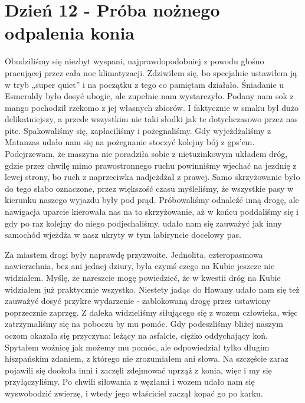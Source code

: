 
\chapter[Próba nożnego odpalenia konia]{Dzień 12 - Próba nożnego odpalenia konia}

Obudziliśmy się niezbyt wyspani, najprawdopodobniej z powodu głośno pracującej przez cała noc klimatyzacji.
Zdziwiłem się, bo specjalnie ustawiłem ją w tryb „super quiet” i na początku z tego co pamiętam działało.
Śniadanie u Esmeraldy było dosyć ubogie, ale zupełnie nam wystarczyło.
Podany nam sok z mango pochodził rzekomo z jej własnych zbiorów.
I faktycznie w smaku był dużo delikatniejszy, a przede wszystkim nie taki słodki jak te dotychczasowo przez nas pite.
Spakowaliśmy się, zapłaciliśmy i pożegnaliśmy.
Gdy wyjeżdżaliśmy z Matanzas udało nam się na pożegnanie stoczyć kolejny bój z gps’em.
Podejrzewam, że maszyna nie poradziła sobie z nietuzinkowym układem dróg, gdzie przez chwilę mimo prawostronnego ruchu powinniśmy wjechać na jezdnię z lewej strony, bo ruch z naprzeciwka nadjeżdżał z prawej.
Samo skrzyżowanie było do tego słabo oznaczone, przez większość czasu myśleliśmy, że wszystkie pasy w kierunku naszego wyjazdu były pod prąd.
Próbowaliśmy odnaleźć inną drogę, ale nawigacja uparcie kierowała nas na to skrzyżowanie, aż w końcu poddaliśmy się i gdy po raz kolejny do niego podjechaliśmy, udało nam się zauważyć jak inny samochód wjeżdża w nasz ukryty w tym labiryncie docelowy pas.
\par Za miastem drogi były naprawdę przyzwoite.
Jednolita, czteropasmowa nawierzchnia, bez ani jednej dziury, była czymś czego na Kubie jeszcze nie widziałem.
Myślę, że nareszcie mogę powiedzieć, że w kwestii dróg na Kubie widziałem już praktycznie wszystko.
Niestety jadąc do Hawany udało nam się też zauważyć dosyć przykre wydarzenie - zablokowaną drogę przez ustawiony poprzecznie zaprzęg.
Z daleka widzieliśmy siłującego się z wozem człowieka, więc zatrzymaliśmy się na poboczu by mu pomóc.
Gdy podeszliśmy bliżej naszym oczom okazała się przyczyna: leżący na asfalcie, ciężko oddychający koń.
Spytałem woźnicę jak możemy mu pomóc, ale odpowiedział tylko długim hiszpańskim zdaniem, z którego nie zrozumiałem ani słowa.
Na szczęście zaraz pojawili się dookoła inni i zaczęli zdejmować uprząż z konia, więc i my się przyłączyliśmy.
Po chwili siłowania z węzłami i wozem udało nam się wyswobodzić zwierzę, i wtedy jego właściciel zaczął kopać go po karku.

